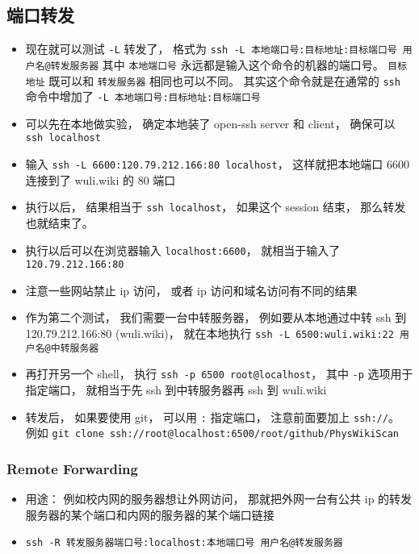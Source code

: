 \subsection{端口转发}
\begin{itemize}
\item 现在就可以测试 \verb|-L| 转发了， 格式为 \verb`ssh -L 本地端口号:目标地址:目标端口号 用户名@转发服务器` 其中 \verb`本地端口号` 永远都是输入这个命令的机器的端口号。 \verb`目标地址` 既可以和 \verb`转发服务器` 相同也可以不同。 其实这个命令就是在通常的 \verb`ssh` 命令中增加了 \verb`-L 本地端口号:目标地址:目标端口号`
\item 可以先在本地做实验， 确定本地装了 open-ssh server 和 client， 确保可以 \verb`ssh localhost`
\item 输入 \verb`ssh -L 6600:120.79.212.166:80 localhost`， 这样就把本地端口 6600 连接到了 wuli.wiki 的 80 端口
\item 执行以后， 结果相当于 \verb`ssh localhost`， 如果这个 session 结束， 那么转发也就结束了。
\item 执行以后可以在浏览器输入 \verb`localhost:6600`， 就相当于输入了 \verb`120.79.212.166:80`
\item 注意一些网站禁止 ip 访问， 或者 ip 访问和域名访问有不同的结果

\item 作为第二个测试， 我们需要一台中转服务器， 例如要从本地通过中转 ssh 到 120.79.212.166:80 (wuli.wiki)， 就在本地执行 \verb`ssh -L 6500:wuli.wiki:22 用户名@中转服务器`
\item 再打开另一个 shell， 执行 \verb`ssh -p 6500 root@localhost`， 其中 \verb`-p` 选项用于指定端口， 就相当于先 ssh 到中转服务器再 ssh 到 wuli.wiki

\item 转发后， 如果要使用 git， 可以用 \verb`:` 指定端口， 注意前面要加上 \verb`ssh://`。  例如 \verb`git clone ssh://root@localhost:6500/root/github/PhysWikiScan`
\end{itemize}

\subsubsection{Remote Forwarding}
\begin{itemize}
\item 用途： 例如校内网的服务器想让外网访问， 那就把外网一台有公共 ip 的转发服务器的某个端口和内网的服务器的某个端口链接
\item \verb`ssh -R 转发服务器端口号:localhost:本地端口号 用户名@转发服务器`
\end{itemize}
